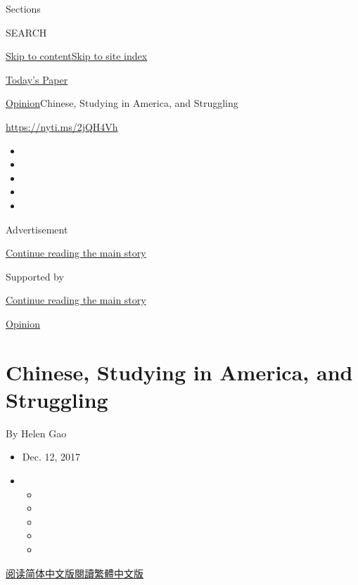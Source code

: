 Sections

SEARCH

\protect\hyperlink{site-content}{Skip to
content}\protect\hyperlink{site-index}{Skip to site index}

\href{https://myaccount.nytimes3xbfgragh.onion/auth/login?response_type=cookie\&client_id=vi}{}

\href{https://www.nytimes3xbfgragh.onion/section/todayspaper}{Today's
Paper}

\href{/section/opinion}{Opinion}\textbar{}Chinese, Studying in America,
and Struggling

\url{https://nyti.ms/2jQH4Vh}

\begin{itemize}
\item
\item
\item
\item
\item
\end{itemize}

Advertisement

\protect\hyperlink{after-top}{Continue reading the main story}

Supported by

\protect\hyperlink{after-sponsor}{Continue reading the main story}

\href{/section/opinion}{Opinion}

\hypertarget{chinese-studying-in-america-and-struggling}{%
\section{Chinese, Studying in America, and
Struggling}\label{chinese-studying-in-america-and-struggling}}

By Helen Gao

\begin{itemize}
\item
  Dec. 12, 2017
\item
  \begin{itemize}
  \item
  \item
  \item
  \item
  \item
  \end{itemize}
\end{itemize}

\href{http://cn.nytimes3xbfgragh.onion/opinion/20171213/chinese-students-mental-health/}{阅读简体中文版}\href{http://cn.nytimes3xbfgragh.onion/opinion/20171213/chinese-students-mental-health/zh-hant/}{閱讀繁體中文版}


